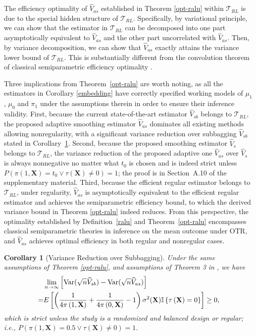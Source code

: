 \documentclass[11pt]{article}
\theoremstyle{referenceplain}
\newtheorem{Corollary}{Corollary}
\theoremstyle{referencedefinition}
\theoremstyle{referenceremark}
\begin{document}
The efficiency optimality of $\widehat{V}_{as}$ established in Theorem \ref{opt-ralu} within $\mathcal{T}_{RL}$ is due to the special hidden structure of $\mathcal{T}_{RL}$. Specifically, by variational principle, we can show that the estimator in $\mathcal{T}_{RL}$ can be decomposed into one part asymptotically equivalent to $\widehat{V}_{as}$ and the other part uncorrelated with $\widehat{V}_{as}$. Then, by variance decomposition, we can show that $\widehat{V}_{as}$ exactly attains the variance lower bound of $\mathcal{T}_{RL}$. This is substantially different from the convolution theorem of classical semiparametric efficiency optimality \citep{bickel1993efficient}.


Three implications from Theorem~\ref{opt-ralu} are worth noting, as all the estimators in Corollary \ref{embedding} have correctly specified working models of $\mu_1$, $\mu_0$ and $\pi_1$ under the assumptions therein in order to ensure their inference validity. First, because the current state-of-the-art estimator $\widehat{V}_{sb}$ belongs to $\mathcal{T}_{RL}$,  the proposed adaptive smoothing estimator $\widehat{V}_{as}$ dominates all existing methods allowing nonregularity, with a significant variance reduction over 
subbagging $\widehat{V}_{sb}$ stated in Corollary~\ref{var-reduce-sb}. Second, because the proposed smoothing estimator $\widehat{V}_s$ belongs to $\mathcal{T}_{RL}$,  the variance reduction of the proposed adaptive one $\widehat{V}_{as}$ over $\widehat{V}_{s}$ 
is always nonnegative no matter what $t_0$ is chosen and is indeed strict unless 
$P(\pi(1,\mathbf{X})=t_0 \lor \tau(\mathbf{X})\neq 0)=1$; 
the proof is in Section~A.10 of the supplementary material. Third, because the efficient regular estimator belongs to $\mathcal{T}_{RL}$, under regularity, $\widehat{V}_{as}$ is asymptotically equivalent to the efficient regular estimator and achieves the semiparametric efficiency bound, to which the derived variance bound in Theorem \ref{opt-ralu} indeed reduces. From this perspective, the optimality established by Definition~\ref{ralu} and Theorem~\ref{opt-ralu} encompasses classical semiparametric theories in inference on the mean outcome under OTR, and $\widehat{V}_{as}$ achieves optimal efficiency in 
both regular and nonregular cases.
\begin{Corollary}[Variance Reduction over Subbagging]\label{var-reduce-sb}
    Under the same assumptions of Theorem \ref{opt-ralu}, and assumptions of Theorem 3 in \citet{shi2020breaking}, we have
    \begin{align}\label{Vsb-Vas}
   &\lim_{n\to\infty}\left[ \operatorname{Var}(\sqrt{n}\widehat{V}_{sb}) - \operatorname{Var}(\sqrt{n}\widehat{V}_{as})\right]\notag\\
   =&E\left[\left(\frac{1}{4 \pi\left(1, \mathbf{X}\right)}+\frac{1}{4\pi\left(0, \mathbf{X}\right)}-1\right){\sigma^2(\mathbf{X})} \mathbb{I}\left\{\tau\left(\mathbf{X}\right)=0\right\}\right]\ge 0,
\end{align}
which is strict unless the study is a randomized and balanced design or regular; i.e., $P(\pi\left(1, \mathbf{X}\right)=0.5 \lor \tau(\mathbf{X})\neq 0)=1$.
\end{Corollary}
\end{document}
